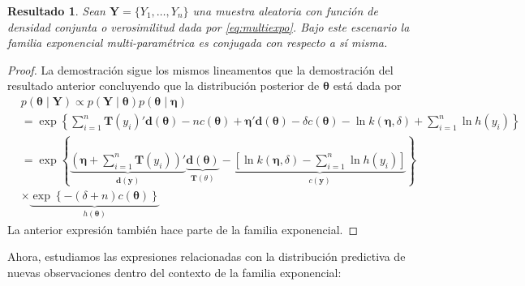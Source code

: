 \documentclass[
  spanish,
]{book}
\newtheorem{proposition}{Resultado}[chapter]
\theoremstyle{definition}
\theoremstyle{definition}
\theoremstyle{definition}
\theoremstyle{remark}
\begin{document}
\begin{proposition}
\protect\hypertarget{prp:unnamed-chunk-7}{}{\label{prp:unnamed-chunk-7} }Sean \(\mathbf{Y}=\{Y_1, \ldots, Y_n\}\) una muestra aleatoria con función de densidad conjunta o verosimilitud dada por \eqref{eq:multiexpo}. Bajo este escenario la familia exponencial multi-paramétrica es conjugada con respecto a sí misma.
\end{proposition}

\begin{proof}
\iffalse{} {Prueba. } \fi{}La demostración sigue los mismos lineamentos que la demostración del resultado anterior concluyendo que la distribución posterior de \(\boldsymbol \theta\) está dada por
\begin{align*}
&p(\boldsymbol \theta\mid \mathbf{Y}) \propto p(\mathbf{Y} \mid \boldsymbol \theta)p(\boldsymbol \theta\mid \boldsymbol \eta)\\
&= \exp\left\{\sum_{i=1}^n\mathbf{T}(y_i)'\mathbf{d}(\boldsymbol \theta) - nc(\boldsymbol \theta) + \boldsymbol \eta' \mathbf{d}(\boldsymbol \theta) - \delta c(\boldsymbol \theta) - \ln k(\boldsymbol \eta,\delta) +\sum_{i=1}^n\ln h(y_i)\right\}\\
& =\exp\left\{\underbrace{\left(\boldsymbol \eta+\sum_{i=1}^n\mathbf{T}(y_i)\right)'}_{\mathbf{d}(\mathbf{y})}
\underbrace{\mathbf{d}(\boldsymbol \theta)}_{\mathbf{T}(\theta)} - \underbrace{\left[\ln k(\boldsymbol \eta,\delta)-\sum_{i=1}^n\ln h(y_i)\right]}_{c(\mathbf{y})}\right\} \\
&  \times \underbrace{\exp\left\{-(\delta+n)c(\boldsymbol \theta)\right\}}_{h(\boldsymbol \theta)}
\end{align*}
La anterior expresión también hace parte de la familia exponencial.
\end{proof}

Ahora, estudiamos las expresiones relacionadas con la distribución
predictiva de nuevas observaciones dentro del contexto de la familia
exponencial:
\end{document}
